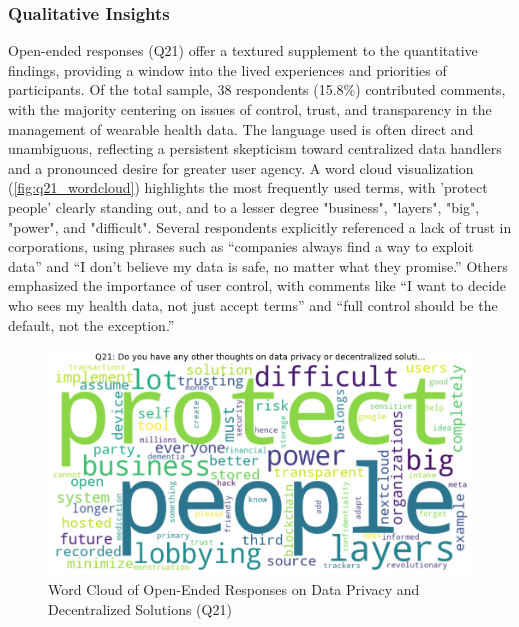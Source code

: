 	\subsubsection{Qualitative Insights}
		Open-ended responses (Q21) offer a textured supplement to the quantitative findings, providing a window into the lived experiences and priorities of participants. Of the total sample, 38 respondents (15.8\%) contributed comments, with the majority centering on issues of control, trust, and transparency in the management of wearable health data. The language used is often direct and unambiguous, reflecting a persistent skepticism toward centralized data handlers and a pronounced desire for greater user agency.
		A word cloud visualization (\autoref{fig:q21_wordcloud}) highlights the most frequently used terms, with 'protect people' clearly standing out, and to a lesser degree "business", "layers", "big", "power", and "difficult". Several respondents explicitly referenced a lack of trust in corporations, using phrases such as “companies always find a way to exploit data” and “I don’t believe my data is safe, no matter what they promise.” Others emphasized the importance of user control, with comments like “I want to decide who sees my health data, not just accept terms” and “full control should be the default, not the exception.”
		
		\begin{figure}[h!]\centering
			\includegraphics[width=0.7\linewidth]{figures/questions/Q21_wordcloud.png}
			\caption{Word Cloud of Open-Ended Responses on Data Privacy and Decentralized Solutions (Q21)}
			\label{fig:q21_wordcloud}
		\end{figure}

